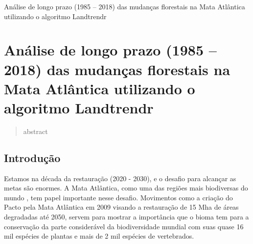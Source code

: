 \begin{titlepage}
    \centering
    \vspace*{\fill}

    \vspace*{0.5cm}

    \Large%
    Análise de longo prazo (1985 – 2018) das mudanças florestais na Mata Atlântica utilizando o algoritmo Landtrendr

    \vspace*{5cm}


    \vspace*{\fill}
\end{titlepage}

\section{Análise de longo prazo (1985 – 2018) das mudanças florestais na Mata Atlântica utilizando o algoritmo Landtrendr}

\begin{abstract}
    abstract
\end{abstract}


\subsection{Introdução}
\hspace{13pt} Estamos na década da restauração (2020 - 2030), e o desafio para alcançar as metas são enormes. A Mata Atlântica, como uma das regiões mais biodiversas do mundo \citep{REZENDE2018208}, tem papel importante nesse desafio. Movimentos como a criação do Pacto pela Mata Atlântica em 2009 visando a restauração de 15 Mha de áreas degradadas até 2050, servem para mostrar a importância que o bioma tem para a conservação da parte considerável da biodiversidade mundial com suas quase 16 mil espécies de plantas e mais de 2 mil espécies de vertebrados.  



